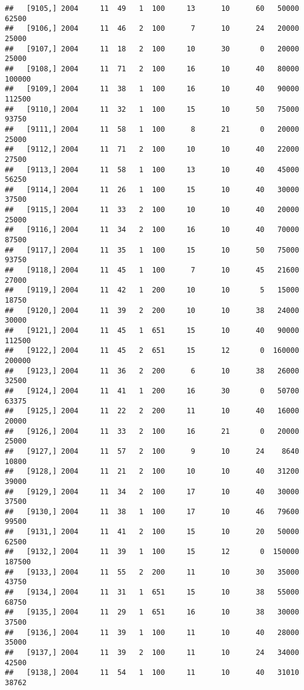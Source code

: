\documentclass{article}\usepackage[]{graphicx}\usepackage[]{color}
\makeatletter
\newenvironment{kframe}{%
 \def\at@end@of@kframe{}%
 \ifinner\ifhmode%
  \def\at@end@of@kframe{\end{minipage}}%
  \begin{minipage}{\columnwidth}%
 \fi\fi%
 \def\FrameCommand##1{\hskip\@totalleftmargin \hskip-\fboxsep
 \colorbox{shadecolor}{##1}\hskip-\fboxsep
     \hskip-\linewidth \hskip-\@totalleftmargin \hskip\columnwidth}%
 \MakeFramed {\advance\hsize-\width
   \@totalleftmargin\z@ \linewidth\hsize
   \@setminipage}}%
 {\par\unskip\endMakeFramed%
 \at@end@of@kframe}
\newenvironment{knitrout}{}{} %
\makeatother
\begin{document}
\begin{knitrout}
\begin{kframe}
\begin{verbatim}
##   [9105,] 2004     11  49   1  100     13      10      60   50000   62500
##   [9106,] 2004     11  46   2  100      7      10      24   20000   25000
##   [9107,] 2004     11  18   2  100     10      30       0   20000   25000
##   [9108,] 2004     11  71   2  100     16      10      40   80000  100000
##   [9109,] 2004     11  38   1  100     16      10      40   90000  112500
##   [9110,] 2004     11  32   1  100     15      10      50   75000   93750
##   [9111,] 2004     11  58   1  100      8      21       0   20000   25000
##   [9112,] 2004     11  71   2  100     10      10      40   22000   27500
##   [9113,] 2004     11  58   1  100     13      10      40   45000   56250
##   [9114,] 2004     11  26   1  100     15      10      40   30000   37500
##   [9115,] 2004     11  33   2  100     10      10      40   20000   25000
##   [9116,] 2004     11  34   2  100     16      10      40   70000   87500
##   [9117,] 2004     11  35   1  100     15      10      50   75000   93750
##   [9118,] 2004     11  45   1  100      7      10      45   21600   27000
##   [9119,] 2004     11  42   1  200     10      10       5   15000   18750
##   [9120,] 2004     11  39   2  200     10      10      38   24000   30000
##   [9121,] 2004     11  45   1  651     15      10      40   90000  112500
##   [9122,] 2004     11  45   2  651     15      12       0  160000  200000
##   [9123,] 2004     11  36   2  200      6      10      38   26000   32500
##   [9124,] 2004     11  41   1  200     16      30       0   50700   63375
##   [9125,] 2004     11  22   2  200     11      10      40   16000   20000
##   [9126,] 2004     11  33   2  100     16      21       0   20000   25000
##   [9127,] 2004     11  57   2  100      9      10      24    8640   10800
##   [9128,] 2004     11  21   2  100     10      10      40   31200   39000
##   [9129,] 2004     11  34   2  100     17      10      40   30000   37500
##   [9130,] 2004     11  38   1  100     17      10      46   79600   99500
##   [9131,] 2004     11  41   2  100     15      10      20   50000   62500
##   [9132,] 2004     11  39   1  100     15      12       0  150000  187500
##   [9133,] 2004     11  55   2  200     11      10      30   35000   43750
##   [9134,] 2004     11  31   1  651     15      10      38   55000   68750
##   [9135,] 2004     11  29   1  651     16      10      38   30000   37500
##   [9136,] 2004     11  39   1  100     11      10      40   28000   35000
##   [9137,] 2004     11  39   2  100     11      10      24   34000   42500
##   [9138,] 2004     11  54   1  100     11      10      40   31010   38762

\end{verbatim}
\end{kframe}
\end{knitrout}
\end{document}
